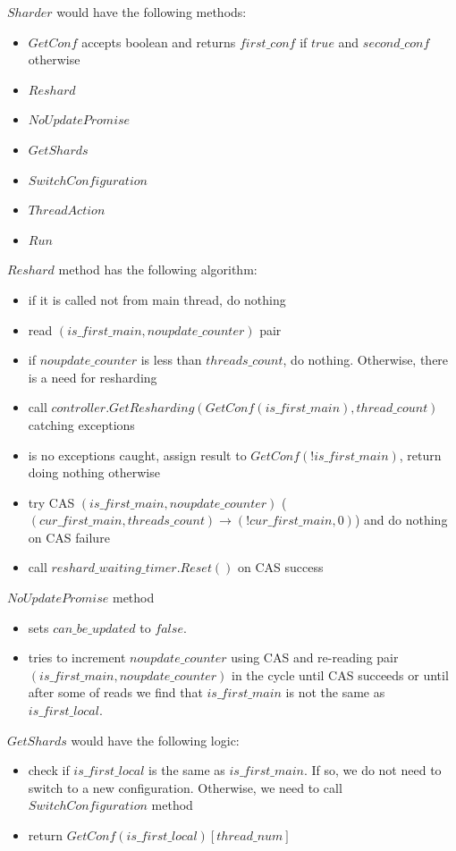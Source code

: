 \documentclass{article}
\begin{document}
$Sharder$ would have the following methods:
\begin{itemize}
	\item $GetConf$ accepts boolean and returns $first\_conf$ if $true$ and $second\_conf$ otherwise
	\item $Reshard$
	\item $NoUpdatePromise$
	\item $GetShards$
	\item $SwitchConfiguration$
	\item $ThreadAction$
	\item $Run$
\end{itemize}

$Reshard$ method has the following algorithm:
\begin{itemize}
	\item if it is called not from main thread, do nothing
	\item read $(is\_first\_main, noupdate\_counter)$ pair
	\item if $noupdate\_counter$ is less than $threads\_count$, do nothing. Otherwise, there is a need for resharding
	\item call $controller.GetResharding(GetConf(is\_first\_main), thread\_count)$ catching exceptions
	\item is no exceptions caught, assign result to $GetConf(!is\_first\_main)$, return doing nothing otherwise
	\item try CAS $(is\_first\_main, noupdate\_counter)$ ($(cur\_first\_main, threads\_count) \rightarrow (!cur\_first\_main, 0)$) and do nothing on CAS failure
	\item call $reshard\_waiting\_timer.Reset()$ on CAS success
\end{itemize}

$NoUpdatePromise$ method
\begin{itemize}
	\item sets $can\_be\_updated$ to $false$.
	\item tries to increment $noupdate\_counter$ using CAS and re-reading pair $(is\_first\_main, noupdate\_counter)$ in the cycle until CAS succeeds or until after some of reads we find that $is\_first\_main$ is not the same as $is\_first\_local$.
\end{itemize}

$GetShards$ would have the following logic:
\begin{itemize}
	\item check if $is\_first\_local$ is the same as $is\_first\_main$. If so, we do not need to switch to a new configuration. Otherwise, we need to call $SwitchConfiguration$ method
	\item return $GetConf(is\_first\_local)[thread\_num]$
\end{itemize}
\end{document}
